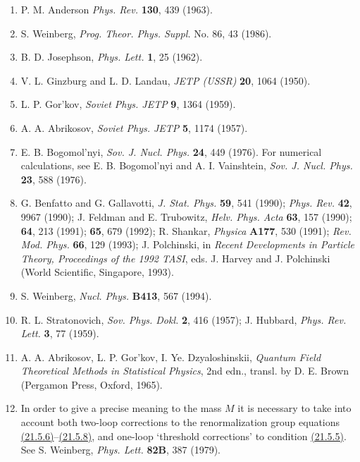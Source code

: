 \begin{enumerate}
\item {}\label{ch21-ref-38}
P. M. Anderson \emph{Phys. Rev.} \textbf{130}, 439 (1963).

\item {}\label{ch21-ref-39}
S. Weinberg, \emph{Prog. Theor. Phys. Suppl.} No. 86, 43 (1986).

\item {}\label{ch21-ref-40}
B. D. Josephson, \emph{Phys. Lett.} \textbf{1}, 25 (1962).

\item {}\label{ch21-ref-41}
V. L. Ginzburg and L. D. Landau, \emph{JETP (USSR)} \textbf{20}, 1064
(1950).

\item {}\label{ch21-ref-42}
L. P. Gor'kov, \emph{Soviet Phys. JETP} \textbf{9}, 1364 (1959).

\item {}\label{ch21-ref-43}
A. A. Abrikosov, \emph{Soviet Phys. JETP} \textbf{5}, 1174 (1957).

\item[43a.] \label{ch21-ref-43a}
E. B. Bogomol'nyi, \emph{Sov. J. Nucl. Phys.} \textbf{24}, 449 (1976).
For numerical calculations, see E. B. Bogomol'nyi and A. I. Vainshtein,
\emph{Sov. J. Nucl. Phys.} \textbf{23}, 588 (1976).

\item {}\label{ch21-ref-44}
G. Benfatto and G. Gallavotti, \emph{J. Stat. Phys.} \textbf{59}, 541
(1990); \emph{Phys. Rev.} \textbf{42}, 9967 (1990); J. Feldman and
E. Trubowitz, \emph{Helv. Phys. Acta} \textbf{63}, 157 (1990);
\textbf{64}, 213 (1991); \textbf{65}, 679 (1992); R. Shankar,
\emph{Physica} \textbf{A177}, 530 (1991); \emph{Rev. Mod. Phys.}
\textbf{66}, 129 (1993); J. Polchinski, in \emph{Recent Developments in
Particle Theory, Proceedings of the 1992 TASI}, eds. J. Harvey and
J. Polchinski (World Scientific, Singapore, 1993).

\item[44a.] \label{ch21-ref-44a}
S. Weinberg, \emph{Nucl. Phys.} \textbf{B413}, 567 (1994).

\item {}\label{ch21-ref-45}
R. L. Stratonovich, \emph{Sov. Phys. Dokl.} \textbf{2}, 416 (1957);
J. Hubbard, \emph{Phys. Rev. Lett.} \textbf{3}, 77 (1959).

\item {}\label{ch21-ref-46}
A. A. Abrikosov, L. P. Gor'kov, I. Ye. Dzyaloshinskii,
\emph{Quantum Field Theoretical Methods in Statistical Physics}, 2nd edn.,
transl. by D. E. Brown (Pergamon Press, Oxford, 1965).

\item {}\label{ch21-ref-47}
In order to give a precise meaning to the mass $M$ it is necessary to take
into account both two-loop corrections to the renormalization group
equations \hyperref[eq:21.5.6]{(21.5.6)}--\hyperref[eq:21.5.8]{(21.5.8)},
and one-loop `threshold corrections' to condition
\hyperref[eq:21.5.5]{(21.5.5)}. See S. Weinberg,
\emph{Phys. Lett.} \textbf{82B}, 387 (1979).
\end{enumerate}
